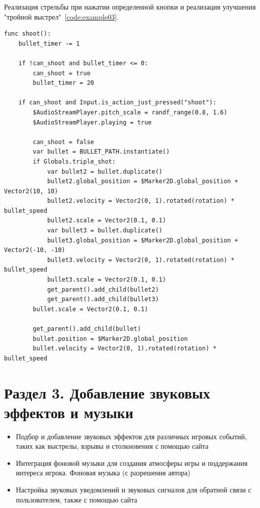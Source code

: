 Реализация стрельбы при нажатии определенной кнопки и реализация улучшения "тройной выстрел"~\ref{code:example03}.
\begin{code}
\vspace{-\baselineskip}\begin{verbatim}
func shoot():
    bullet_timer -= 1

    if !can_shoot and bullet_timer <= 0:
        can_shoot = true
        bullet_timer = 20

    if can_shoot and Input.is_action_just_pressed("shoot"):
        $AudioStreamPlayer.pitch_scale = randf_range(0.8, 1.6)
        $AudioStreamPlayer.playing = true

        can_shoot = false
        var bullet = BULLET_PATH.instantiate()
        if Globals.triple_shot:
            var bullet2 = bullet.duplicate()
            bullet2.global_position = $Marker2D.global_position + Vector2(10, 10)
            bullet2.velocity = Vector2(0, 1).rotated(rotation) * bullet_speed
            bullet2.scale = Vector2(0.1, 0.1)
            var bullet3 = bullet.duplicate()
            bullet3.global_position = $Marker2D.global_position + Vector2(-10, -10)
            bullet3.velocity = Vector2(0, 1).rotated(rotation) * bullet_speed
            bullet3.scale = Vector2(0.1, 0.1)
            get_parent().add_child(bullet2)
            get_parent().add_child(bullet3)
        bullet.scale = Vector2(0.1, 0.1)

        get_parent().add_child(bullet)
        bullet.position = $Marker2D.global_position
        bullet.velocity = Vector2(0, 1).rotated(rotation) * bullet_speed
\end{verbatim}
\end{code}

\section{\label{sec:ch02/sec03}Раздел 3. Добавление звуковых эффектов и музыки}

\begin{itemize}
    \item Подбор и добавление звуковых эффектов для различных игровых событий, таких как выстрелы, взрывы и столкновения с помощью сайта \cite{https://sfxr.me/}
    \item Интеграция фоновой музыки для создания атмосферы игры и поддержания интереса игрока. Фоновая музыка (с разрешения автора) \cite{https://www.youtube.com/watch?v=-35AC-FPoAA}
    \item Настройка звуковых уведомлений и звуковых сигналов для обратной связи с пользователем, также с помощью сайта \cite{https://sfxr.me/}
\end{itemize}
 